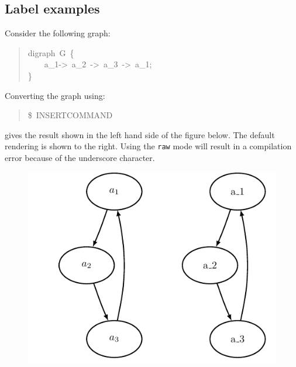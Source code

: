 \documentclass[10pt,a4paper,english]{article}
\begin{document}

\hypertarget{label-examples}{}
\subsection*{Label examples}
\label{label-examples}

Consider the following graph:
\begin{quote}{\ttfamily \raggedright \noindent
digraph~G~{\{}~\\
~~~~a{\_}1->~a{\_}2~->~a{\_}3~->~a{\_}1;~\\
{\}}
}\end{quote}

Converting the graph using:
\begin{quote}{\ttfamily \raggedright \noindent
{\$}~INSERTCOMMAND
}\end{quote}

gives the result shown in the left hand side of the figure below. The default rendering is shown to the right. Using the \texttt{raw} mode will result in a compilation error because of the underscore character.
\begin{figure}[H]
\centering

\includegraphics{pdf/ex1comb}
\end{figure}
\end{document}
